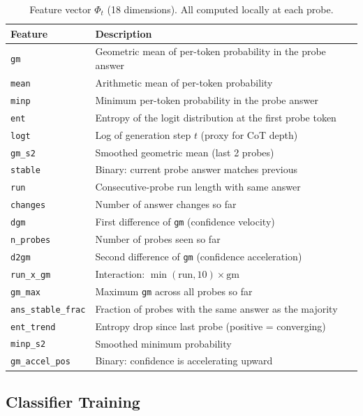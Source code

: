 \documentclass[11pt]{article}
\begin{document}
\begin{table}[t]
\centering
\caption{Feature vector $\Phi_t$ (18 dimensions). All computed locally at each probe.}
\label{tab:features}
\small
\begin{tabular}{lp{8cm}}
\toprule
\textbf{Feature} & \textbf{Description} \\
\midrule
\texttt{gm}  & Geometric mean of per-token probability in the probe answer \\
\texttt{mean} & Arithmetic mean of per-token probability \\
\texttt{minp} & Minimum per-token probability in the probe answer \\
\texttt{ent}  & Entropy of the logit distribution at the first probe token \\
\texttt{logt} & Log of generation step $t$ (proxy for CoT depth) \\
\texttt{gm\_s2} & Smoothed geometric mean (last 2 probes) \\
\texttt{stable} & Binary: current probe answer matches previous \\
\texttt{run}  & Consecutive-probe run length with same answer \\
\texttt{changes} & Number of answer changes so far \\
\texttt{dgm}  & First difference of \texttt{gm} (confidence velocity) \\
\texttt{n\_probes} & Number of probes seen so far \\
\texttt{d2gm} & Second difference of \texttt{gm} (confidence acceleration) \\
\texttt{run\_x\_gm} & Interaction: $\min(\text{run},10) \times \text{gm}$ \\
\texttt{gm\_max} & Maximum \texttt{gm} across all probes so far \\
\texttt{ans\_stable\_frac} & Fraction of probes with the same answer as the majority \\
\texttt{ent\_trend} & Entropy drop since last probe (positive = converging) \\
\texttt{minp\_s2} & Smoothed minimum probability \\
\texttt{gm\_accel\_pos} & Binary: confidence is accelerating upward \\
\bottomrule
\end{tabular}
\end{table}

\subsection{Classifier Training}
\end{document}
